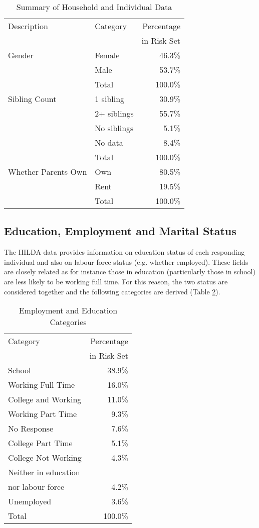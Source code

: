 \documentclass[12pt]{article}
\begin{document}
\begin{table}[htpb]
\centering
\caption{Summary of Household and Individual Data}
\label{HILDATab}
\begin{tabular}{llr}
\toprule
Description & Category & Percentage \\
&& in Risk Set \\
\midrule
Gender & Female &  46.3\% \\
   & Male &  53.7\% \\
   & Total & 100.0\% \\
\midrule
Sibling Count & 1 sibling &  30.9\% \\
   & 2+ siblings &  55.7\% \\
   & No siblings &   5.1\% \\
   & No data &   8.4\% \\
   & Total & 100.0\% \\
\midrule
Whether Parents Own & Own &  80.5\% \\
    & Rent &  19.5\% \\
    & Total & 100.0\% \\
\bottomrule
\end{tabular}
\end{table}

\subsection{Education, Employment and Marital Status}

The HILDA data provides information on education status of each responding individual and also on labour force status (e.g. whether employed). These fields are closely related as for instance those in education (particularly those in school) are less likely to be working full time. For this reason, the two status are considered together and the following categories are derived (Table \ref{empEduTab}).

\begin{table}[htpb]
\centering
\caption{Employment and Education Categories}
\label{empEduTab}
\begin{tabular}{lr}
\toprule
Category & Percentage \\
& in Risk Set \\
\midrule
School &  38.9\% \\
  Working Full Time &  16.0\% \\
  College and Working &  11.0\% \\
  Working Part Time &   9.3\% \\
  No Response &   7.6\% \\
  College Part Time &   5.1\% \\
  College Not Working &   4.3\% \\
  Neither in education & \\
  nor labour force &   4.2\% \\
  Unemployed &   3.6\% \\
  Total & 100.0\% \\
\bottomrule
\end{tabular}
\end{table}
\end{document}
